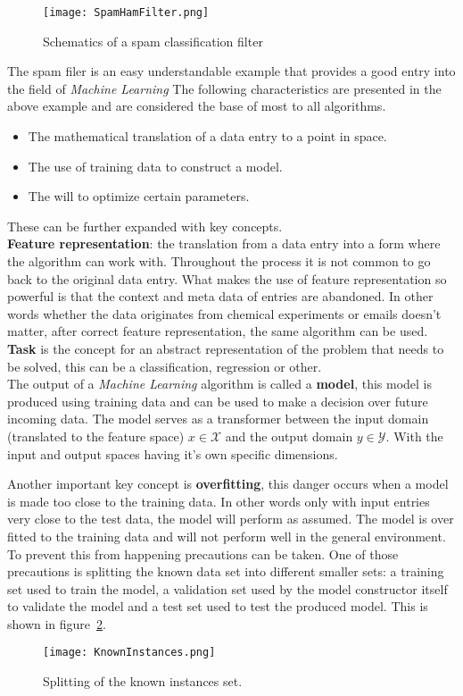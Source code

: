 \begin{figure}[H]
	\centering
	\texttt{[image: SpamHamFilter.png]}
	\caption{Schematics of a spam classification filter }
	\label{fig:spamhamML}
\end{figure}
The spam filer is an easy understandable example that provides a good entry into the field of \textit{Machine Learning}\cite{FlachPeter2012MLTA}
The following characteristics are presented in the above example and are considered the base of most to all algorithms.
\begin{itemize}
	\item The mathematical translation of a data entry to a point in space.
	\item The use of training data to construct a model.
	\item The will to optimize certain parameters. 
\end{itemize}

These can be further expanded with key concepts.\\
\textbf{Feature representation}: the translation from a data entry into a form where the algorithm can work with. 
Throughout the process it is not common to go back to the original data entry. 
What makes the use of feature representation so powerful is that the context and meta data of entries are abandoned.
In other words whether the data originates from chemical experiments or emails doesn't matter, after correct feature representation, the same algorithm can be used.\\
\textbf{Task} is the concept for an abstract representation of the problem that needs to be solved, this can be a classification, regression or other.\\
The output of a \textit{Machine Learning} algorithm is called a  \textbf{model}, this model is produced using training data and can be used to make a decision over future incoming data.
The model serves as a transformer between the input domain (translated to the feature space) $ x \in \mathscr{X}  $ and the output domain $ y \in \mathscr{Y}$.
With the input and output spaces having it's own specific dimensions.
\par 
Another important key concept is \textbf{overfitting}, this danger occurs when a model is made too close to the training data.
In other words only with input entries very close to the test data, the model will perform as assumed.
The model is over fitted to the training data and will not perform well in the general environment.
To prevent this from happening precautions can be taken.
One of those precautions is splitting the known data set into different smaller sets: a training set used to train the model, a validation set used by the model constructor itself to validate the model and a test set used to test the produced model.
This is shown in figure~\ref{fig:knownInstances}.
\begin{figure}[H]
	\centering
	\texttt{[image: KnownInstances.png]}
	\caption{Splitting of the known instances set. }
	\label{fig:knownInstances}
\end{figure}

